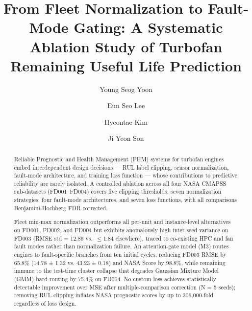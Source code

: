 \documentclass[review,12pt]{elsarticle}
\begin{document}
\begin{frontmatter}

\title{From Fleet Normalization to Fault-Mode Gating: A Systematic Ablation Study of Turbofan Remaining Useful Life Prediction}

\author[inst1]{Young Seog Yoon}

\author[inst1]{Eun Seo Lee}

\author[inst1]{Hyeontae Kim}

\author[inst2]{Ji Yeon Son}



\begin{abstract}
Reliable Prognostic and Health Management (PHM) systems for turbofan engines embed interdependent design decisions — RUL label clipping, sensor normalization, fault-mode architecture, and training loss function — whose contributions to predictive reliability are rarely isolated. A controlled ablation across all four NASA CMAPSS sub-datasets (FD001–FD004) covers five clipping thresholds, seven normalization strategies, four fault-mode architectures, and seven loss functions, with all comparisons Benjamini-Hochberg FDR-corrected.

Fleet min-max normalization outperforms all per-unit and instance-level alternatives on FD001, FD002, and FD004 but exhibits anomalously high inter-seed variance on FD003 (RMSE std = 12.86 vs.\ $\leq\!1.84$ elsewhere), traced to co-existing HPC and fan fault modes rather than normalization failure. An attention-gate model (M3) routes engines to fault-specific branches from ten initial cycles, reducing FD003 RMSE by 65.8\% (14.78 ± 1.32 vs. 43.23 ± 0.18) and NASA Score by 98.8\%, while remaining immune to the test-time cluster collapse that degrades Gaussian Mixture Model (GMM) hard-routing by 75.4\% on FD004. No custom loss achieves statistically detectable improvement over MSE after multiple-comparison correction (N = 5 seeds); removing RUL clipping inflates NASA prognostic scores by up to 306,000-fold regardless of loss design.


\end{abstract}
\end{frontmatter}
\end{document}

